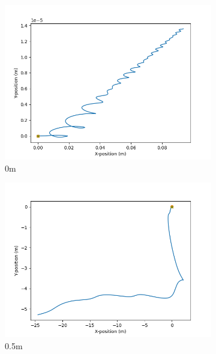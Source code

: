 \documentclass[class=article, crop=false]{standalone}
\begin{document}
\begin{figure}
    \centering
    \begin{subfigure}[b]{0.48\textwidth}
        \centering
        \includegraphics{scenario1/rov-50m/0.0m/usv_position_uncontrolled}
        \caption{0m}
        \label{}
    \end{subfigure}
    \hfill
    \begin{subfigure}[b]{0.48\textwidth}
        \centering
        \includegraphics{scenario1/rov-50m/0.5m/usv_position_uncontrolled}
        \caption{0.5m}
        \label{}
    \end{subfigure}
    \vfill
    \begin{subfigure}[b]{0.48\textwidth}
        \centering

\end{subfigure}
\end{figure}
\end{document}
